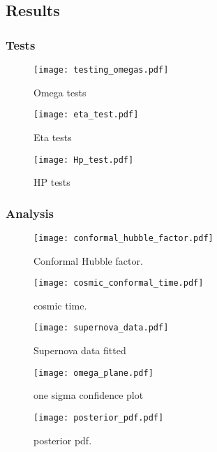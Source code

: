 \subsection{Results}\label{sec:m1:results}

\subsubsection{Tests}\label{sec:m1:results:tests}

\begin{figure}
    \texttt{[image: testing\_omegas.pdf]}
    \caption{Omega tests}
    \label{fig:m1:omega_tests}
\end{figure}

\begin{figure}
    \texttt{[image: eta\_test.pdf]}
    \caption{Eta tests}
    \label{fig:m1:eta_tests}
\end{figure}

\begin{figure}
    \texttt{[image: Hp\_test.pdf]}
    \caption{HP tests}
    \label{fig:m1:Hp_tests}
\end{figure}

\subsubsection{Analysis}



\begin{figure}
    \texttt{[image: conformal\_hubble\_factor.pdf]}
    \caption{Conformal Hubble factor.}
    \label{fig:m1:conformal_hubble_factor_Hp}
\end{figure}

\begin{figure}
    \texttt{[image: cosmic\_conformal\_time.pdf]}
    \caption{cosmic time.}
    \label{fig:m1:cosmic_conformal_time}
\end{figure}

\begin{figure}
    \texttt{[image: supernova\_data.pdf]}
    \caption{Supernova data fitted}
    \label{fig:m1:supernova_data}
\end{figure}

\begin{figure}
    \texttt{[image: omega\_plane.pdf]}
    \caption{one sigma confidence plot}
    \label{fig:m1:omega_planes}
\end{figure}

\begin{figure}
    \texttt{[image: posterior\_pdf.pdf]}
    \caption{posterior pdf.}
    \label{fig:m1:posterior_pdf}
\end{figure}

